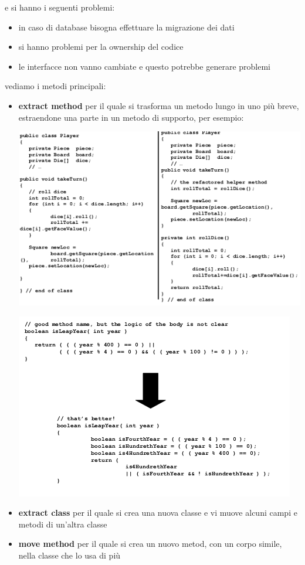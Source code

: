 \documentclass[a4paper,12pt, oneside]{book}
\begin{document}
e si hanno i seguenti problemi:
\begin{itemize}
\item in caso di database bisogna effettuare la migrazione dei dati
\item si hanno problemi per la ownership del codice
\item le interfacce non vanno cambiate e questo potrebbe generare problemi
\end{itemize}
vediamo i metodi principali:
\begin{itemize}
\item \textbf{extract method} per il quale si trasforma un metodo lungo in uno più breve, estraendone una parte in un metodo di supporto, per esempio:
\begin{center}
\includegraphics[scale = 0.8]{img/refa.png}
\end{center}
\begin{center}
\includegraphics[scale = 0.8]{img/refa2.png}
\end{center}
\item \textbf{extract class} per il quale si crea una nuova classe e vi muove alcuni campi e metodi di un'altra classe
\item \textbf{move method} per il quale si crea  un nuovo metod, con un corpo simile, nella classe che lo usa di più
\end{itemize}
\end{document}
